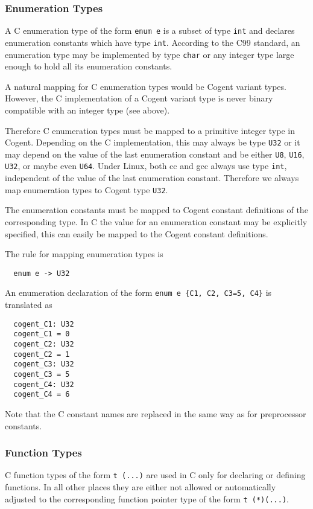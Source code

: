 \documentclass[a4paper]{report}
\newcommand{\code}[1]{\textnormal{\texttt{#1}}}
\begin{document}
\subsubsection{Enumeration Types}

A C enumeration type of the form \code{enum e} is a subset of type \code{int} and declares enumeration 
constants which have type \code{int}. According to the C99 standard, an enumeration type may be implemented
by type \code{char} or any integer type large enough to hold all its enumeration constants.

A natural mapping for C enumeration types would be Cogent variant types. However, the C implementation
of a Cogent variant type is never binary compatible with an integer type (see above). 

Therefore C enumeration types must be mapped to a primitive integer type in Cogent. Depending on the C
implementation, this may always be type \code{U32} or it may depend on the value of the last enumeration
constant and be either \code{U8}, \code{U16}, \code{U32}, or maybe even \code{U64}. Under Linux, both cc
and gcc always use type \code{int}, independent of the value of the last enumeration constant. 
Therefore we always map enumeration types to Cogent type \code{U32}.

The enumeration constants must be mapped to Cogent constant definitions of the corresponding type. In 
C the value for an enumeration constant may be explicitly specified, this can easily be mapped to
the Cogent constant definitions.

The rule for mapping enumeration types is
\begin{verbatim}
  enum e -> U32
\end{verbatim}

An enumeration declaration of the form \code{enum e \{C1, C2, C3=5, C4\}} is translated as
\begin{verbatim}
  cogent_C1: U32
  cogent_C1 = 0
  cogent_C2: U32
  cogent_C2 = 1
  cogent_C3: U32
  cogent_C3 = 5
  cogent_C4: U32
  cogent_C4 = 6
\end{verbatim}
Note that the C constant names are replaced in the same way as for preprocessor constants.

\subsubsection{Function Types}

C function types of the form \code{t (...)} are used in C only for declaring or defining functions. In all other
places they are either not allowed or automatically adjusted to the corresponding function pointer type
of the form \code{t (*)(...)}. 
\end{document}
